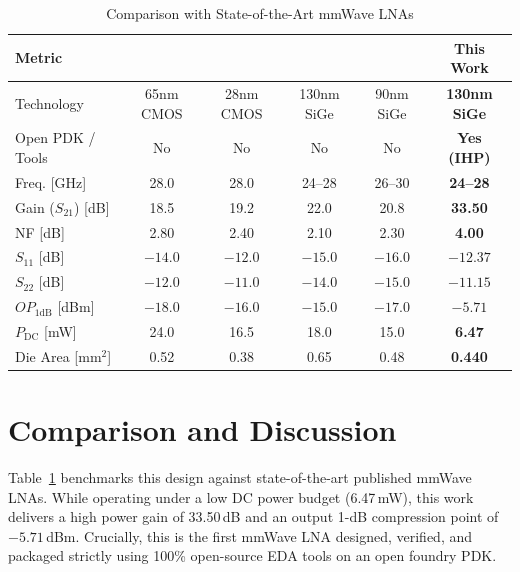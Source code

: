 \documentclass[conference]{IEEEtran}
\begin{document}
\begin{table}[t]
\caption{Comparison with State-of-the-Art mmWave LNAs}
\label{tab:comparison}
\centering
\begin{tabular}{lccccc}
\toprule
\textbf{Metric} & \textbf{\cite{ref_jssc1}} & \textbf{\cite{ref_rfic1}} & \textbf{\cite{ref_ims1}} & \textbf{\cite{ref_tmt1}} & \textbf{This Work} \\
\midrule
Technology & 65nm CMOS & 28nm CMOS & 130nm SiGe & 90nm SiGe & \textbf{130nm SiGe} \\
Open PDK / Tools & No & No & No & No & \textbf{Yes (IHP)} \\
Freq. [GHz] & 28.0 & 28.0 & 24--28 & 26--30 & \textbf{24--28} \\
Gain ($S_{21}$) [dB] & 18.5 & 19.2 & 22.0 & 20.8 & \textbf{33.50} \\
NF [dB] & 2.80 & 2.40 & 2.10 & 2.30 & \textbf{4.00} \\
$S_{11}$ [dB] & $-14.0$ & $-12.0$ & $-15.0$ & $-16.0$ & \textbf{$-12.37$} \\
$S_{22}$ [dB] & $-12.0$ & $-11.0$ & $-14.0$ & $-15.0$ & \textbf{$-11.15$} \\
$OP_{1\mathrm{dB}}$ [dBm] & $-18.0$ & $-16.0$ & $-15.0$ & $-17.0$ & \textbf{$-5.71$} \\
$P_{\text{DC}}$ [mW] & 24.0 & 16.5 & 18.0 & 15.0 & \textbf{6.47} \\
Die Area [$\text{mm}^2$] & 0.52 & 0.38 & 0.65 & 0.48 & \textbf{0.440} \\
\bottomrule
\end{tabular}
\end{table}

\section{Comparison and Discussion}
Table~\ref{tab:comparison} benchmarks this design against state-of-the-art published mmWave LNAs. While operating under a low DC power budget (6.47\,mW), this work delivers a high power gain of 33.50\,dB and an output 1-dB compression point of $-5.71$\,dBm. Crucially, this is the first mmWave LNA designed, verified, and packaged strictly using 100\% open-source EDA tools on an open foundry PDK.
\end{document}
